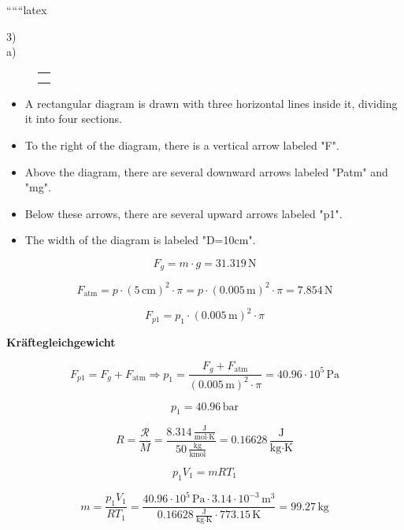 
``````latex


3) \\
a) \\

\begin{figure}[h!]
\centering
\begin{minipage}{0.3\textwidth}
\centering
\begin{tabular}{|c|}
\hline
\\
\hline
\\
\hline
\\
\hline
\end{tabular}
\end{minipage}
\end{figure}

\begin{itemize}
    \item A rectangular diagram is drawn with three horizontal lines inside it, dividing it into four sections.
    \item To the right of the diagram, there is a vertical arrow labeled "F".
    \item Above the diagram, there are several downward arrows labeled "Patm" and "mg".
    \item Below these arrows, there are several upward arrows labeled "p1".
    \item The width of the diagram is labeled "D=10cm".
\end{itemize}

\[
F_g = m \cdot g = 31.319 \, \text{N}
\]

\[
F_{\text{atm}} = p \cdot (5 \, \text{cm})^2 \cdot \pi = p \cdot (0.005 \, \text{m})^2 \cdot \pi = 7.854 \, \text{N}
\]

\[
F_{p1} = p_1 \cdot (0.005 \, \text{m})^2 \cdot \pi
\]

\textbf{Kräftegleichgewicht}

\[
F_{p1} = F_g + F_{\text{atm}} \Rightarrow p_1 = \frac{F_g + F_{\text{atm}}}{(0.005 \, \text{m})^2 \cdot \pi} = 40.96 \cdot 10^5 \, \text{Pa}
\]

\[
p_1 = 40.96 \, \text{bar}
\]

\[
R = \frac{\mathcal{R}}{M} = \frac{8.314 \, \frac{\text{J}}{\text{mol} \cdot \text{K}}}{50 \, \frac{\text{kg}}{\text{kmol}}} = 0.16628 \, \frac{\text{J}}{\text{kg} \cdot \text{K}}
\]

\[
p_1 V_1 = m R T_1
\]

\[
m = \frac{p_1 V_1}{R T_1} = \frac{40.96 \cdot 10^5 \, \text{Pa} \cdot 3.14 \cdot 10^{-3} \, \text{m}^3}{0.16628 \, \frac{\text{J}}{\text{kg} \cdot \text{K}} \cdot 773.15 \, \text{K}} = 99.27 \, \text{kg}
\]

